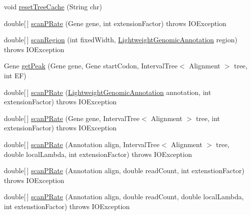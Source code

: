 \begin{DoxyCompactItemize}
\item 
void \hyperlink{classbroad_1_1pda_1_1seq_1_1segmentation_1_1_alignment_data_model_stats_a957570171da9d3781fe5a587f9ba09fb}{reset\+Tree\+Cache} (String chr)
\item 
double\mbox{[}$\,$\mbox{]} \hyperlink{classbroad_1_1pda_1_1seq_1_1segmentation_1_1_alignment_data_model_stats_accc819fd09f1e1c607e3b66aab3ae2e0}{scan\+P\+Rate} (Gene gene, int extension\+Factor)  throws I\+O\+Exception 
\item 
double\mbox{[}$\,$\mbox{]} \hyperlink{classbroad_1_1pda_1_1seq_1_1segmentation_1_1_alignment_data_model_stats_a20d56595ce0228db7c4a9ffce432c909}{scan\+Region} (int fixed\+Width, \hyperlink{interfacebroad_1_1core_1_1annotation_1_1_lightweight_genomic_annotation}{Lightweight\+Genomic\+Annotation} region)  throws I\+O\+Exception
\item 
Gene \hyperlink{classbroad_1_1pda_1_1seq_1_1segmentation_1_1_alignment_data_model_stats_acf64ec3269f39b7e56e9b0ec5eacec52}{get\+Peak} (Gene gene, Gene start\+Codon, Interval\+Tree$<$ Alignment $>$ tree, int E\+F)
\item 
double\mbox{[}$\,$\mbox{]} \hyperlink{classbroad_1_1pda_1_1seq_1_1segmentation_1_1_alignment_data_model_stats_aa4ce3b9bed13ef3599fe979aa3e5d867}{scan\+P\+Rate} (\hyperlink{interfacebroad_1_1core_1_1annotation_1_1_lightweight_genomic_annotation}{Lightweight\+Genomic\+Annotation} annotation, int extension\+Factor)  throws I\+O\+Exception 
\item 
double\mbox{[}$\,$\mbox{]} \hyperlink{classbroad_1_1pda_1_1seq_1_1segmentation_1_1_alignment_data_model_stats_a3a6b4166fdef87dfcc75965ca3afa36a}{scan\+P\+Rate} (Gene gene, Interval\+Tree$<$ Alignment $>$ tree, int extension\+Factor)  throws I\+O\+Exception 
\item 
double\mbox{[}$\,$\mbox{]} \hyperlink{classbroad_1_1pda_1_1seq_1_1segmentation_1_1_alignment_data_model_stats_a27c70d2052e1a72c453e4a455bc4e720}{scan\+P\+Rate} (Annotation align, Interval\+Tree$<$ Alignment $>$ tree, double local\+Lambda, int extension\+Factor)  throws I\+O\+Exception
\item 
double\mbox{[}$\,$\mbox{]} \hyperlink{classbroad_1_1pda_1_1seq_1_1segmentation_1_1_alignment_data_model_stats_a7762df709ca48c9d35a5b8ce56075b90}{scan\+P\+Rate} (Annotation align, double read\+Count, int extenstion\+Factor)  throws I\+O\+Exception
\item 
double\mbox{[}$\,$\mbox{]} \hyperlink{classbroad_1_1pda_1_1seq_1_1segmentation_1_1_alignment_data_model_stats_ab87df511e1d345a7481a4195ec6575d3}{scan\+P\+Rate} (Annotation align, double read\+Count, double local\+Lambda, int extenstion\+Factor)  throws I\+O\+Exception

\end{DoxyCompactItemize}
